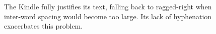 \begin{figure}
    \centering
    \caption[Poor typography on the Kindle]{The Kindle fully justifies its text, falling back to ragged-right when inter-word spacing would become too large. Its lack of hyphenation exacerbates this problem.}
    \label{fig:crapkindle}
\end{figure}



